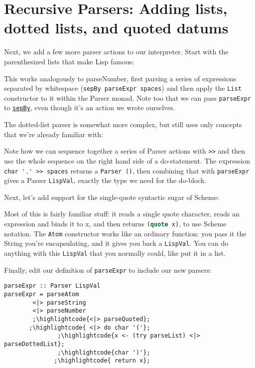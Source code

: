 \section{Recursive Parsers: Adding lists, dotted lists, and quoted datums}
 
Next, we add a few more parser actions to our interpreter. Start with the parenthesized lists that make Lisp famous:
 
 
This works analogously to parseNumber, first parsing a series of expressions separated by whitespace (\lstinline|sepBy parseExpr spaces|) and then apply the \verb|List| constructor to it within the Parser monad. Note too that we can pass \verb|parseExpr| to \href{http://www.cs.uu.nl/~daan/download/parsec/parsec.html\#sepBy}{\texttt{sepBy}}, even though it's an action we wrote ourselves.
 
The dotted-list parser is somewhat more complex, but still uses only concepts that we're already familiar with:
 
 
Note how we can sequence together a series of Parser actions with \lstinline|>>| and then use the whole sequence on the right hand side of a do-statement. The expression \lstinline|char '.' >> spaces| returns a \verb|Parser ()|, then combining that with \verb|parseExpr| gives a Parser \verb|LispVal|, exactly the type we need for the do-block.
 
Next, let's add support for the single-quote syntactic sugar of Scheme:
 
 
Most of this is fairly familiar stuff: it reads a single quote character, reads an expression and binds it to x, and then returns \lstinline[language=lisp]|(quote x)|, to use Scheme notation. The \verb|Atom| constructor works like an ordinary function: you pass it the String you're encapsulating, and it gives you back a \verb|LispVal|. You can do anything with this \verb|LispVal| that you normally could, like put it in a list.
 
Finally, edit our definition of \verb|parseExpr| to include our new parsers:
 
\begin{lstlisting}
parseExpr :: Parser LispVal
parseExpr = parseAtom
        <|> parseString
        <|> parseNumber
        ;\highlightcode{<|> parseQuoted};
       ;\highlightcode{ <|> do char '('};
               ;\highlightcode{x <- (try parseList) <|> parseDottedList};
               ;\highlightcode{char ')'};
              ;\highlightcode{ return x};
\end{lstlisting}
 
